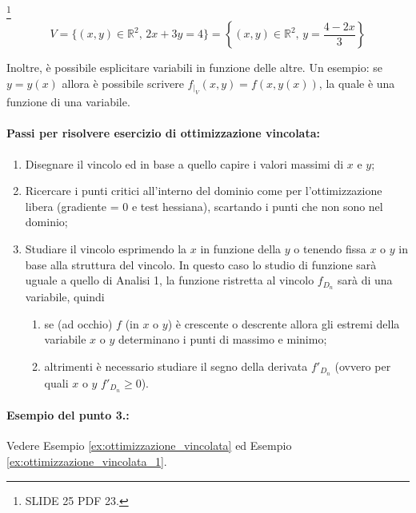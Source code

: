 \begin{example}
	\footnote{SLIDE 25 PDF 23.}  
	\begin{equation*}
		V=\{(x,y)\in\mathbb{R}^2,\, 2x+3y=4\} = \left\{(x,y)\in\mathbb{R}^2,\, y=\frac{4-2x}{3}\right\}
	\end{equation*}
\end{example}

Inoltre, è possibile esplicitare variabili in funzione delle altre. Un esempio: se $y=y(x)$ allora è possibile scrivere $f_{|_V}(x,y) = f(x, y(x))$, la quale è una funzione di una variabile.

\paragraph{Passi per risolvere esercizio di ottimizzazione vincolata:}
\begin{enumerate}
	\item Disegnare il vincolo ed in base a quello capire i valori massimi di $x$ e $y$;
	\item Ricercare i punti critici all'interno del dominio come per l'ottimizzazione libera (gradiente = 0 e test hessiana), scartando i punti che non sono nel dominio;
	\item Studiare il vincolo esprimendo la $x$ in funzione della $y$ o tenendo fissa $x$ o $y$ in base alla struttura del vincolo. In questo caso lo studio di funzione sarà uguale a quello di Analisi 1, la funzione ristretta al vincolo $f_{D_n}$ sarà di una variabile, quindi
	\begin{enumerate}
		\item se (ad occhio) $f$ (in $x$ o $y$) è crescente o descrente allora gli estremi della variabile $x$ o $y$ determinano i punti di massimo e minimo;
		\item altrimenti è necessario studiare il segno della derivata $f'_{D_n}$ (ovvero per quali $x$ o $y$ $f'_{D_n}\geq 0$).
	\end{enumerate}
\end{enumerate}

\paragraph{Esempio del punto 3.:} Vedere Esempio \ref{ex:ottimizzazione_vincolata} ed Esempio \ref{ex:ottimizzazione_vincolata_1}.

